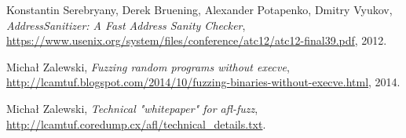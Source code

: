 \begin{thebibliography}{9}

	Konstantin Serebryany, Derek Bruening, Alexander Potapenko, Dmitry Vyukov,
	\textit{AddressSanitizer: A Fast Address Sanity Checker},
  \url{https://www.usenix.org/system/files/conference/atc12/atc12-final39.pdf},
	2012.

  Michał Zalewski,
  \textit{Fuzzing random programs without execve},
	\url{http://lcamtuf.blogspot.com/2014/10/fuzzing-binaries-without-execve.html},
  2014.

  Michał Zalewski,
  \textit{Technical "whitepaper" for afl-fuzz},
  \url{http://lcamtuf.coredump.cx/afl/technical_details.txt}.

\end{thebibliography}
